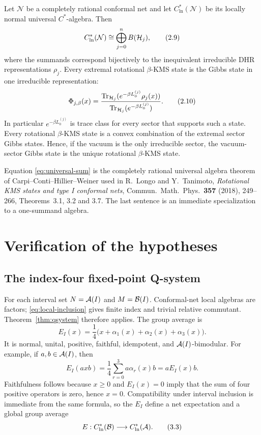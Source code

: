 \begin{theorem}
\label{thm:lt}
Let $\mathcal N$ be a completely rational conformal net and let
$C^*_{\mathrm{ln}}(\mathcal N)$ be its locally normal universal
$C^*$-algebra.  Then
\[
 C^*_{\mathrm{ln}}(\mathcal N)
 \cong\bigoplus_{j=0}^{n}B(\mathcal H_j),
\tag{2.9}\label{eq:universal-sum}
\]
where the summands correspond bijectively to the inequivalent
irreducible DHR representations $\rho_j$.  Every extremal rotational
$\beta$-KMS state is the Gibbs state in one irreducible
representation:
\[
 \Phi_{j,\beta}(x)
 =\frac{\operatorname{Tr}_{\mathcal H_j}(e^{-\beta L_0^{(j)}}\rho_j(x))}
 {\operatorname{Tr}_{\mathcal H_j}(e^{-\beta L_0^{(j)}})}.
\tag{2.10}\label{eq:sector-gibbs}
\]
In particular $e^{-\beta L_0^{(j)}}$ is trace class for every sector
that supports such a state.  Every rotational $\beta$-KMS state is a
convex combination of the extremal sector Gibbs states.  Hence, if
the vacuum is the only irreducible sector, the vacuum-sector Gibbs
state is the unique rotational $\beta$-KMS state.
\end{theorem}

Equation \eqref{eq:universal-sum} is the completely rational universal
algebra theorem of Carpi--Conti--Hillier--Weiner used in
R.~Longo and Y.~Tanimoto, \emph{Rotational KMS states and type I
conformal nets}, Commun.\ Math.\ Phys.\ \textbf{357} (2018),
249--266, Theorems~3.1, 3.2 and 3.7.  The last sentence is an
immediate specialization to a one-summand algebra.

\section{Verification of the hypotheses}

\subsection{The index-four fixed-point Q-system}

For each interval set $N=\mathcal A(I)$ and $M=\mathcal B(I)$.  Conformal-net local
algebras are factors; \eqref{eq:local-inclusion} gives finite index
and trivial relative commutant.  Theorem~\ref{thm:qsystem} therefore
applies.  The group average is
\[
 E_I(x)=\frac14\bigl(x+\alpha_1(x)+\alpha_2(x)+\alpha_3(x)\bigr).
\tag{3.1}\label{eq:EI}
\]
It is normal, unital, positive, faithful, idempotent, and
$\mathcal A(I)$-bimodular.  For example, if $a,b\in\mathcal A(I)$, then
\[
 E_I(axb)=\frac14\sum_{r=0}^{3}a\alpha_r(x)b
 =aE_I(x)b.
\tag{3.2}\label{eq:bimodule}
\]
Faithfulness follows because $x\geq0$ and $E_I(x)=0$ imply that the
sum of four positive operators is zero, hence $x=0$.  Compatibility
under interval inclusion is immediate from the same formula, so the
$E_I$ define a net expectation and a global group average
\[
 E:C^*_{\mathrm{ln}}(\mathcal B)\longrightarrow
 C^*_{\mathrm{ln}}(\mathcal A).
\tag{3.3}\label{eq:global-E}
\]

